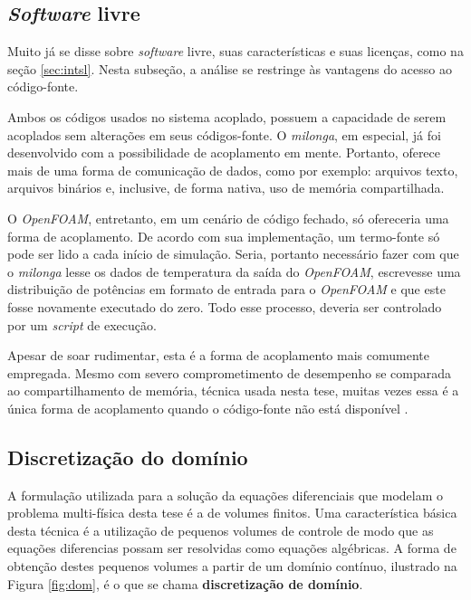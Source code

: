 \subsection{\textit{Software} livre}
\label{subsec:sl}

Muito já se disse sobre \textit{software} livre, suas características e suas licenças, como na
seção \ref{sec:intsl}. Nesta subseção, a análise se restringe às vantagens do acesso ao
código-fonte.

Ambos os códigos usados no sistema acoplado, possuem a capacidade de serem acoplados sem alterações
em seus códigos-fonte. O \textit{milonga}, em especial, já foi desenvolvido com a possibilidade
de acoplamento em mente. Portanto, oferece mais de uma forma de comunicação de dados, como por exemplo:
arquivos texto, arquivos binários e, inclusive, de forma nativa, uso de memória compartilhada.

O \textit{OpenFOAM}, entretanto, em um cenário de código fechado, só ofereceria uma forma de
acoplamento. De acordo com sua implementação, um termo-fonte só pode ser lido a cada início de
simulação. Seria, portanto necessário fazer com que o \textit{milonga} lesse os dados de temperatura
da saída do \textit{OpenFOAM}, escrevesse uma distribuição de potências em formato de entrada
para o \textit{OpenFOAM} e que este fosse novamente executado do zero. Todo esse processo, deveria
ser controlado por um \textit{script} de execução.

Apesar de soar rudimentar, esta é a forma de acoplamento mais comumente empregada.
Mesmo com severo comprometimento de desempenho se comparada ao compartilhamento de
memória, técnica usada nesta tese, muitas vezes essa é a única forma de acoplamento
quando o código-fonte não está disponível \cite{Ivanov2007}.

\subsection{Discretização do domínio}
\label{subsec:dd}

A formulação utilizada para a solução da equações diferenciais que modelam o problema multi-física desta
tese é a de volumes finitos. Uma característica básica desta técnica é a utilização de pequenos volumes
de controle de modo que as equações diferencias possam ser resolvidas como equações algébricas. A forma de obtenção
destes pequenos volumes a partir de um domínio contínuo, ilustrado na Figura \ref{fig:dom},
é o que se chama \textbf{discretização de domínio}.

